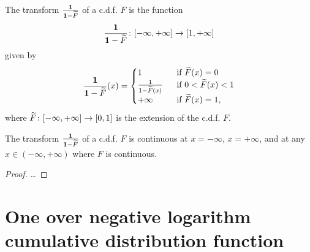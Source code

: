 \begin{definition}
  \label{def:one-div-one-sub-cdf}
  \leanok
  The transform $\frac{\mathbf{1}}{\mathbf{1}-\widetilde{F}}$ of a c.d.f. $F$ is the function
  \begin{align*}
    \frac{\mathbf{1}}{\mathbf{1}-\widetilde{F}} \colon [-\infty,+\infty] \to [1,+\infty]
  \end{align*}
  given by
  \begin{align*}
    \frac{\mathbf{1}}{\mathbf{1}-\widetilde{F}}(x) = \begin{cases}
      1 & \; \text{ if } \widetilde{F}(x) = 0 \\
      \frac{1}{1-\widetilde{F}(x)} & \; \text{ if } 0 < \widetilde{F}(x) < 1 \\
      +\infty & \; \text{ if } \widetilde{F}(x) = 1 ,
      \end{cases}
  \end{align*}
  where $\widetilde{F} \colon [-\infty,+\infty] \to [0,1]$ is the extension of the c.d.f. $F$.
\end{definition}

\begin{lemma}
  \label{lem:one-div-one-sub-cdf-continuity-pts}
  \leanok
  The transform $\frac{\mathbf{1}}{\mathbf{1}-\widetilde{F}}$ of a c.d.f. $F$ is continuous
  at $x = -\infty$, $x = + \infty$, and at any
  $x \in (-\infty,+\infty)$ where $F$ is continuous.
\end{lemma}
\begin{proof}
  \ldots
\end{proof}

\section{One over negative logarithm cumulative distribution function}


